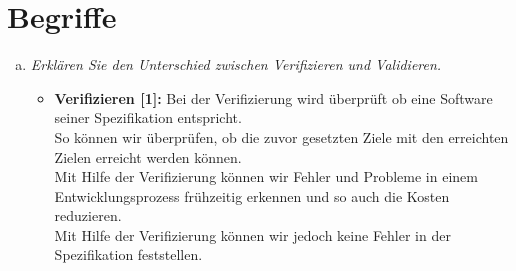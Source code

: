 

\newcommand{\dozent}{Lutz Prechelt}
\newcommand{\tutor}{Samuel Domiks}
\newcommand{\tutoriumNo}{02\\Materialien: Latex, Skript}
\newcommand{\ubungNo}{10}
\newcommand{\veranstaltung}{Softwaretechnik}
\newcommand{\semester}{SoSe21}
\newcommand{\studenten}{Jonny Lam \& Thore Brehmer}




\section{Begriffe}
\begin{enumerate}[(a)]
\item{\itshape Erklären Sie den Unterschied zwischen Verifizieren und Validieren.}
\begin{itemize}
    \item \textbf{Verifizieren [1]:} Bei der Verifizierung wird überprüft ob eine Software seiner Spezifikation entspricht.\\
    So können wir überprüfen, ob die zuvor gesetzten Ziele mit den erreichten Zielen erreicht werden können.\\
    Mit Hilfe der Verifizierung können wir Fehler und Probleme in einem Entwicklungsprozess frühzeitig erkennen und so auch die Kosten reduzieren. \\
    Mit Hilfe der Verifizierung können wir jedoch keine Fehler in der Spezifikation feststellen.\\
    

\end{itemize}
\end{enumerate}
